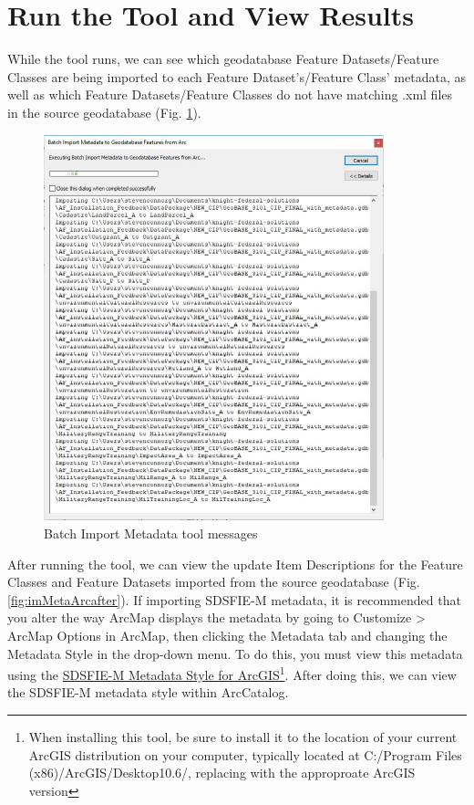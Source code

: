 \documentclass[openany]{book}
\let\rmarkdownfootnote\footnote%
\def\footnote{\protect\rmarkdownfootnote}
\theoremstyle{definition}
\theoremstyle{definition}
\theoremstyle{definition}
\theoremstyle{remark}
\begin{document}
\section{Run the Tool and View
Results}\label{run-the-tool-and-view-results-13}

While the tool runs, we can see which geodatabase Feature
Datasets/Feature Classes are being imported to each Feature
Dataset's/Feature Class' metadata, as well as which Feature
Datasets/Feature Classes do not have matching .xml files in the source
geodatabase (Fig. \ref{fig:imMetaArcmessages}).

\begin{figure}[H]

{\centering \includegraphics[width=3.89in,]{figures/imMetaArc-messages} 

}

\caption{Batch Import Metadata tool messages}\label{fig:imMetaArcmessages}
\end{figure}

After running the tool, we can view the update Item Descriptions for the
Feature Classes and Feature Datasets imported from the source
geodatabase (Fig. \ref{fig:imMetaArcafter}). If importing SDSFIE-M
metadata, it is recommended that you alter the way ArcMap displays the
metadata by going to Customize \textgreater{} ArcMap Options in ArcMap,
then clicking the Metadata tab and changing the Metadata Style in the
drop-down menu. To do this, you must view this metadata using the
\href{https://www.sdsfieonline.org/Standards/Metadata}{SDSFIE-M Metadata
Style for ArcGIS}\footnote{When installing this tool, be sure to install
  it to the location of your current ArcGIS distribution on your
  computer, typically located at C:/Program Files
  (x86)/ArcGIS/Desktop10.6/, replacing with the approproate ArcGIS
  version}. After doing this, we can view the SDSFIE-M metadata style
within ArcCatalog.
\end{document}
